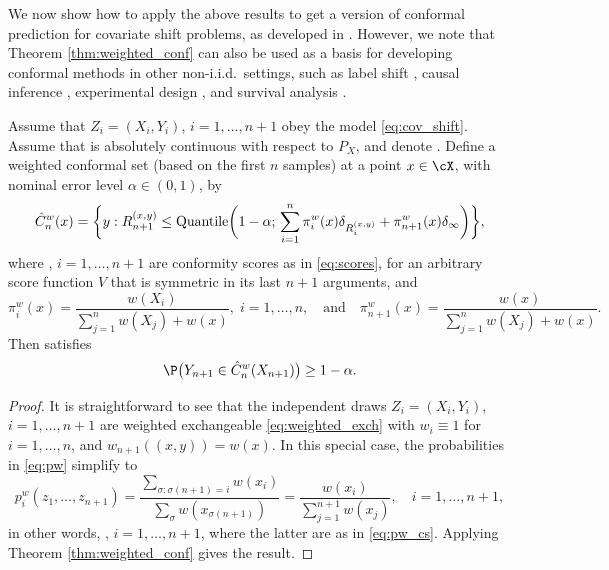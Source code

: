 \documentclass{article}
\begin{document}
We now show how to apply the above results to get a version of conformal
prediction for covariate shift problems, as developed in
\citet{tibshirani2019conformal}. However, we note that Theorem 
\ref{thm:weighted_conf} can also be used as a basis for developing conformal
methods in other non-i.i.d.\ settings, such as label shift
\citep{podkopaev2021distribution}, causal inference \citep{lei2021conformal},
experimental design \citep{fannjiang2022conformal}, and survival analysis
\citep{candes2023conformalized}. 

\begin{corollary}
\label{cor:weighted_conf_cs}
Assume that $Z_i=(X_i,Y_i)$, $i=1,\dots,n+1$ obey the model
\eqref{eq:cov_shift}.  Assume that  is absolutely continuous with
respect to $P_X$, and denote .  Define a weighted
conformal set (based on the first $n$ samples) at a point $x \in \cX$, with
nominal error level $\alpha \in (0,1)$, by 
\begin{equation}
\label{eq:weighted_conf_cs}
\hat{C}^w_n(x) = \bigg\{ y : R_{n+1}^{(x,y)} \leq \mathrm{Quantile}\bigg( 1-\alpha; 
\, \sum_{i=1}^n \pi^w_i(x) \delta_{R_i^{(x,y)}} + \pi^w_{n+1}(x) \delta_\infty 
\bigg) \bigg\}, 
\end{equation}
where , $i=1,\ldots,n+1$ are conformity scores as in
\eqref{eq:scores}, for an arbitrary score function $V$ that is symmetric in its
last $n+1$ arguments, and
\begin{equation}
\label{eq:pw_cs}
\pi^w_i(x) = \frac{w(X_i)}{\sum_{j=1}^n w(X_j) + w(x)}, \; i=1,\ldots,n, 
\quad \text{and} \quad 
\pi^w_{n+1}(x) = \frac{w(x)}{\sum_{j=1}^n w(X_j) + w(x)}. 
\end{equation}
Then  satisfies 
\begin{equation}
\label{eq:weighted_cov_cs}
\P\big( Y_{n+1} \in \hC^w_n(X_{n+1}) \big) \geq 1-\alpha. 
\end{equation}
\end{corollary}

\begin{proof}
It is straightforward to see that the independent draws $Z_i = (X_i,Y_i)$,
$i=1,\ldots,n+1$ are weighted exchangeable \eqref{eq:weighted_exch} with
$w_i\equiv 1$ for $i=1,\ldots,n$, and $w_{n+1}((x,y))=w(x)$. In this special
case, the probabilities in \eqref{eq:pw} simplify to  
\[
p^w_i(z_1,\ldots,z_{n+1}) = \frac{\sum_{\sigma : \sigma(n+1)=i}
  w(x_i)}{\sum_\sigma w(x_{\sigma(n+1)})} =
\frac{w(x_i)}{\sum_{j=1}^{n+1}w(x_j)}, \quad i=1,\ldots,n+1,
\]
in other words, ,
$i=1,\ldots,n+1$, where the latter are as in \eqref{eq:pw_cs}. Applying Theorem 
\ref{thm:weighted_conf} gives the result.  \end{proof}  
\end{document}
